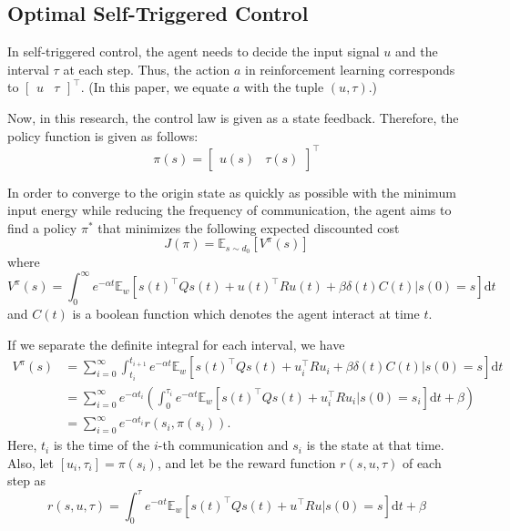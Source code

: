 \documentclass[english, dvipdfmx]{ampmt}             %
\newcommand{\expect}{\mathbb{E}}
\begin{document}
\subsection{Optimal Self-Triggered Control}
\label{sec:formulation}
In self-triggered control, the agent needs to decide the input signal $u$ and the interval $\tau$ at each step. Thus, the action $a$ in reinforcement learning corresponds to $\begin{bmatrix}u & \tau \end{bmatrix}^{\top}$. (In this paper, we equate $a$ with the tuple $(u,\tau)$.) \par
Now, in this research, the control law is given as a state feedback. Therefore, the policy function is given as follows:
\begin{equation}
	\pi(s) = \begin{bmatrix}u(s) & \tau(s)\end{bmatrix}^{\top}
\end{equation}\par
In order to converge to the origin state as quickly as possible with the minimum input energy while reducing the frequency of communication, the agent aims to find a policy $\pi^{*}$ that minimizes the following expected discounted cost 
\begin{equation}
	J(\pi)=\expect_{s\sim d_0}[V^{\pi}(s)] \label{evaluation}
\end{equation}
where
\begin{equation}
	V^{\pi}(s) = \int_{0}^{\infty} e^{-\alpha t}\expect_{w}[s(t)^{\top}Qs(t)+u(t)^{\top}Ru(t)+\beta \delta(t)C(t)|s(0)=s]\textrm{d}t \label{such_that}
\end{equation}
and $C(t)$ is a boolean function which denotes the agent interact at time $t$.\par
If we separate the definite integral for each interval, we have 
\begin{align}
	V^{\pi}(s) &= \sum_{i=0}^{\infty}\int_{t_i}^{t_{i+1}} e^{-\alpha t}\expect_{w}[s(t)^{\top}Qs(t)+u_i^{\top}Ru_i+\beta \delta(t)C(t)|s(0)=s]\textrm{d}t \nonumber \\
			 &= \sum_{i=0}^{\infty} e^{-\alpha t_i} \left(\int_{0}^{\tau_i}e^{-\alpha t}\expect_{w}[s(t)^{\top}Qs(t)+u_i^{\top}Ru_i|s(0)=s_i]\textrm{d}t + \beta\right) \nonumber \\
			 &= \sum_{i=0}^{\infty} e^{-\alpha t_i} r(s_i, \pi(s_i)) \label{self_acc_reward}.
\end{align}
Here, $t_i$ is the time of the $i$-th communication and $s_i$ is the state at that time. Also, let $[u_i, \tau_i]=\pi(s_i)$, and let be the reward function $r(s, u, \tau)$ of each step as
\begin{equation}
	r(s, u, \tau) = \int_{0}^{\tau}e^{-\alpha t}\expect_{w}[s(t)^{\top}Qs(t)+u^{\top}Ru|s(0)=s]\textrm{d}t + \beta
\end{equation}
\end{document}
